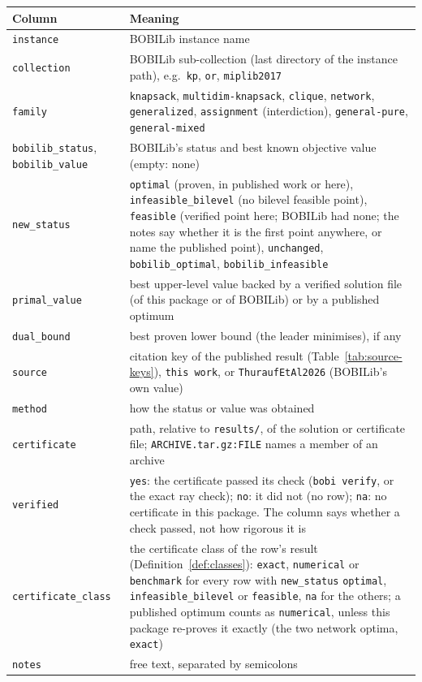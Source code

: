 \begin{center}
\small
\begin{tabular}{@{}p{1.5in}p{4.8in}@{}}
\toprule
Column & Meaning\\
\midrule
\texttt{instance} & BOBILib instance name\\
\texttt{collection} & BOBILib sub-collection (last directory of the instance path), e.g.\ \texttt{kp}, \texttt{or}, \texttt{miplib2017}\\
\texttt{family} & \texttt{knapsack}, \texttt{multidim-knapsack}, \texttt{clique}, \texttt{network}, \texttt{generalized}, \texttt{assignment} (interdiction), \texttt{general-pure}, \texttt{general-mixed}\\
\texttt{bobilib\_status}, \texttt{bobilib\_value} & BOBILib's status and best known objective value (empty: none)\\
\texttt{new\_status} & \texttt{optimal} (proven, in published work or here), \texttt{infeasible\_bilevel} (no bilevel feasible point), \texttt{feasible} (verified point here; BOBILib had none; the notes say whether it is the first point anywhere, or name the published point), \texttt{unchanged}, \texttt{bobilib\_optimal}, \texttt{bobilib\_infeasible}\\
\texttt{primal\_value} & best upper-level value backed by a verified solution file (of this package or of BOBILib) or by a published optimum\\
\texttt{dual\_bound} & best proven lower bound (the leader minimises), if any\\
\texttt{source} & citation key of the published result (Table~\ref{tab:source-keys}), \texttt{this work}, or \texttt{ThuraufEtAl2026} (BOBILib's own value)\\
\texttt{method} & how the status or value was obtained\\
\texttt{certificate} & path, relative to \texttt{results/}, of the solution or certificate file; \texttt{ARCHIVE.tar.gz:FILE} names a member of an archive\\
\texttt{verified} & \texttt{yes}: the certificate passed its check (\texttt{bobi verify}, or the exact ray check); \texttt{no}: it did not (no row); \texttt{na}: no certificate in this package. The column says whether a check passed, not how rigorous it is\\
\texttt{certificate\_class} & the certificate class of the row's result (Definition~\ref{def:classes}): \texttt{exact}, \texttt{numerical} or \texttt{benchmark} for every row with \texttt{new\_status} \texttt{optimal}, \texttt{infeasible\_bilevel} or \texttt{feasible}, \texttt{na} for the others; a published optimum counts as \texttt{numerical}, unless this package re-proves it exactly (the two network optima, \texttt{exact})\\
\texttt{notes} & free text, separated by semicolons\\
\bottomrule
\end{tabular}
\end{center}

